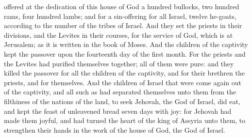 offered at the dedication of this house of God a hundred bullocks, two hundred rams, four hundred lambs; and for a sin-offering for all Israel, twelve he-goats, according to the number of the tribes of Israel. And they set the priests in their divisions, and the Levites in their courses, for the service of God, which is at Jerusalem; as it is written in the book of Moses.  And the children of the captivity kept the passover upon the fourteenth day of the first month. For the priests and the Levites had purified themselves together; all of them were pure: and they killed the passover for all the children of the captivity, and for their brethren the priests, and for themselves. And the children of Israel that were come again out of the captivity, and all such as had separated themselves unto them from the filthiness of the nations of the land, to seek Jehovah, the God of Israel, did eat, and kept the feast of unleavened bread seven days with joy: for Jehovah had made them joyful, and had turned the heart of the king of Assyria unto them, to strengthen their hands in the work of the house of God, the God of Israel. 

